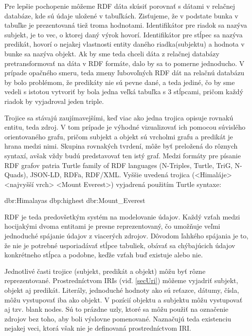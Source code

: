 Pre lepšie pochopenie môžeme RDF dáta skúsiť porovnať s dátami v relačnej databáze, kde sú údaje uložené v tabuľkách. Zisťujeme, že v podstate bunka v tabuľke je prezentovaná tiež troma hodnotami. Identifikátor pre riadok sa nazýva subjekt, je to vec, o ktorej daný výrok hovorí. Identifikátor pre stĺpec sa
nazýva predikát, hovorí o nejakej vlastnosti entity daného riadka(subjektu) a hodnota
v bunke sa nazýva objekt. Ak by sme teda chceli dáta z relačnej databázy pretransformovať na dáta v RDF formáte, dalo by sa to pomerne jednoducho. V prípade opačného smeru, teda zmeny ľubovoľných RDF dát na relačnú databázu by bolo problémom, že predikáty nie sú pevne dané, a teda jediné, čo by sme vedeli s istotou vytvoriť by bola jedna veľká tabuľka s 3 stĺpcami, pričom každý riadok by vyjadroval jeden triple.

Trojice sa stávajú zaujímavejšími, keď viac ako jedna trojica opisuje rovnakú entitu, teda zdroj.
V tom prípade je výhodné vizualizovať ich pomocou súvislého orientovaného grafu, pričom subjekt a objekt sú vrcholmi grafu a predikát je hrana medzi nimi. Skupina rovnakých tvrdení, môže byť preložená do rôznych syntaxí, avšak vždy budú predstavovať ten istý graf. Medzi formáty pre písanie RDF grafov patria Turtle family
of RDF languages (N-Triples, Turtle, TriG, N-Quads), JSON-LD, RDFa, RDF/XML. 
Vyššie uvedená trojica (<Himaláje> <najvyšší vrch> <Mount Everest>) vyjadrená použitím Turtle syntaxe:   
\begin{center}
dbr:Himalayas dbp:highest dbr:Mount\_Everest
\end{center}

RDF je teda predovšetkým systém na modelovanie údajov. Každý vzťah medzi
hocijakými dvoma entitami je presne reprezentovaný, čo umožňuje veľmi
jednoduché spájanie údajov z viacerých zdrojov. Dôvodom ľahkého spájania je to, že nie je potrebné usporiadávať
stĺpce tabuliek, obávať sa chýbajúcich údajov konkrétneho stĺpca a podobne, keďže
vzťah buď existuje alebo nie.

Jednotlivé časti trojice (subjekt, predikát a objekt) môžu byť rôzne reprezentované. 
Prostredníctvom IRIs (viď. \ref{secUri}) môžeme vyjadriť subjekt, objekt aj predikát. Literály, jednoduché hodnoty ako sú reťazce, dátumy, čísla, môžu vystupovať iba ako objekt. V pozícií objektu a subjektu môžu vystupovať aj tzv. blank nodes. Sú to prázdne uzly, ktoré sa môžu použiť na označenie zdrojov bez toho, aby boli výslovne pomenované. Naznačujú teda existenciu nejakej veci, ktorá však nie je definovaná prostredníctvom IRI. 

